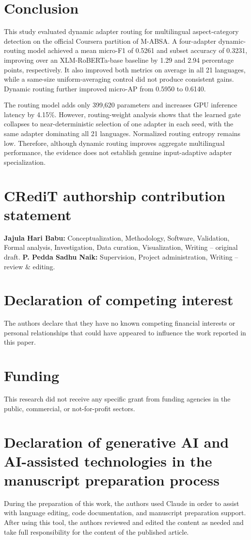 \documentclass[review,12pt]{elsarticle}
\begin{document}
\section{Conclusion}
This study evaluated dynamic adapter routing for multilingual aspect-category detection on the official Coursera partition of M-ABSA. A four-adapter dynamic-routing model achieved a mean micro-F1 of 0.5261 and subset accuracy of 0.3231, improving over an XLM-RoBERTa-base baseline by 1.29 and 2.94 percentage points, respectively. It also improved both metrics on average in all 21 languages, while a same-size uniform-averaging control did not produce consistent gains. Dynamic routing further improved micro-AP from 0.5950 to 0.6140.

The routing model adds only 399,620 parameters and increases GPU inference latency by 4.15\%. However, routing-weight analysis shows that the learned gate collapses to near-deterministic selection of one adapter in each seed, with the same adapter dominating all 21 languages. Normalized routing entropy remains low. Therefore, although dynamic routing improves aggregate multilingual performance, the evidence does not establish genuine input-adaptive adapter specialization.

\section*{CRediT authorship contribution statement}
\textbf{Jajula Hari Babu:} Conceptualization, Methodology, Software, Validation, Formal analysis, Investigation, Data curation, Visualization, Writing -- original draft. \textbf{P. Pedda Sadhu Naik:} Supervision, Project administration, Writing -- review \& editing.

\section*{Declaration of competing interest}
The authors declare that they have no known competing financial interests or personal relationships that could have appeared to influence the work reported in this paper.

\section*{Funding}
This research did not receive any specific grant from funding agencies in the public, commercial, or not-for-profit sectors.

\section*{Declaration of generative AI and AI-assisted technologies in the manuscript preparation process}
During the preparation of this work, the authors used Claude in order to assist with language editing, code documentation, and manuscript preparation support. After using this tool, the authors reviewed and edited the content as needed and take full responsibility for the content of the published article.
\end{document}

